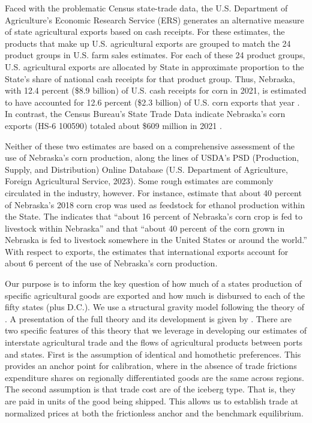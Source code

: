 \documentclass{ejb}
\begin{document}
Faced with the problematic Census state-trade data, the U.S.
Department of Agriculture's Economic Research Service (ERS) generates
an alternative measure of state agricultural exports based on cash
receipts.  For these estimates, the products that make up U.S.
agricultural exports are grouped to match the 24 product groups in
U.S. farm sales estimates. For each of these 24 
product groups, U.S. agricultural exports are allocated by State in
approximate proportion to the State's share of national cash receipts
for that product group. Thus, Nebraska, with 12.4 percent (\$8.9
billion) of U.S. cash receipts for corn in 2021, is estimated to have
accounted for 12.6 percent (\$2.3 billion) of U.S. corn exports that
year \citep{USDA_a, USDA_b}. In contrast, the Census Bureau's State Trade Data
indicate Nebraska's corn exports (HS-6 100590) totaled about \$609
million in 2021 \citep{Census}.

Neither of these two estimates are based on a comprehensive
assessment of the use of Nebraska's corn production, along the lines
of USDA's PSD (Production, Supply, and Distribution) Online Database
(U.S. Department of Agriculture, Foreign Agricultural Service, 2023).
Some rough estimates are commonly circulated in the industry,
however. For instance, \citet{Groskopf_Silva} estimate that about
40 percent of Nebraska's 2018 corn crop was used as feedstock for
ethanol production within the State. The \citet{NCBa}
indicates that ``about 16 percent of Nebraska's corn crop is fed to
livestock within Nebraska'' and that ``about 40 percent of the corn
grown in Nebraska is fed to livestock somewhere in the United States
or around the world.'' With respect to exports, the \citet{NCBb}
estimates that international exports account for about 
6 percent of the use of Nebraska's corn production.
          
Our purpose is to inform the key question of how much of a states
production of specific agricultural goods are exported and how much is
disbursed to each of the fifty states (plus D.C.).  We use a
structural gravity model following the theory of \citet{AvW}.  A
presentation of the full theory and its development is given by
\citet{Yotov_etal}.  There are two specific features of this theory
that we leverage in developing our estimates of interstate
agricultural trade and the flows of agricultural products between
ports and states. First is the assumption of identical and homothetic
preferences.  This provides an anchor point for calibration, where in
the absence of trade frictions expenditure shares on regionally
differentiated goods are the same across regions. The second
assumption is that trade cost are of the iceberg type.  That is, they
are paid in units of the good being shipped.  This allows us to
establish trade at normalized prices at both the frictionless anchor
and the benchmark equilibrium. 
\end{document}
